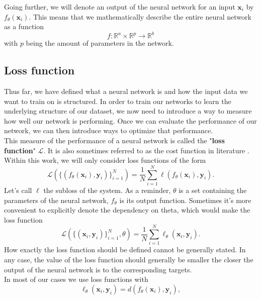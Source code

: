 Going further, we will denote an output of the neural network for an input $\mathbf{x}_i$ by $f_\theta(\mathbf{x}_i)$. This means that we mathematically describe the entire neural network as a function
\begin{equation}
	f: \mathbb{R}^a \times \mathbb{R}^p \rightarrow \mathbb{R}^b
\end{equation}
with $p$ being the amount of parameters in the network.

\subsection{Loss function}
Thus far, we have defined what a neural network is and how the input data we want to train on is structured. In order to train our networks to learn the underlying structure of our dataset, we now need to introduce a way to measure how well our network is performing. Once we can evaluate the performance of our network, we can then introduce ways to optimize that performance.\\
This measure of the performance of a neural network is called the "\textbf{loss function}" $\mathscr{L}$. It is also sometimes referred to as the cost function in literature \cite{NGD}. Within this work, we will only consider loss functions of the form 
\begin{equation}
	\mathscr{L}\left( \{(f_\theta(\mathbf{x}_i), \mathbf{y}_i)\}_{i=1}^{N} \right) = \frac{1}{N} \sum_{i=1}^{N} \ell\left(f_\theta(\mathbf{x}_i),\mathbf{y}_i\right).
	\label{eq:Loss_longform_withFunctiondependency}
\end{equation}
Let's call $\ell$ the subloss of the system. As a reminder, $\theta$ is a set containing the parameters of the neural network, $f_\theta$ is its output function. Sometimes it's more convenient to explicitly denote the dependency on theta, which would make the loss function
\begin{equation}\label{eq:Loss_longform}
	\mathscr{L}\left( \{(\mathbf{x}_i, \mathbf{y}_i)\}_{i=1}^{N}, \theta \right) = \frac{1}{N} \sum_{i=1}^{N} \ell_\theta\left(\mathbf{x}_i,\mathbf{y}_i\right).
\end{equation}
How exactly the loss function should be defined cannot be generally stated. In any case, the value of the loss function should generally be smaller the closer the output of the neural network is to the corresponding targets.\\
In most of our cases we use loss functions with 
\begin{equation}
	\ell_\theta \left( \mathbf{x}_i,\mathbf{y}_i\right) = 
	d\left(f_\theta(\mathbf{x}_i), \mathbf{y}_i\right),
\end{equation}
